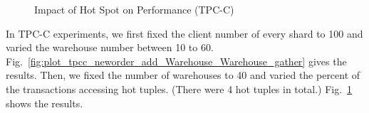 \documentclass[conference]{IEEEtran}
\begin{document}
\begin{figure}[tbp]
  \centering
      \caption{Impact of Hot Spot on Performance (TPC-C) }
      \label{fig:plot_tpcc_neworder_add_HotItem_HotItem_gather}
\end{figure}



In TPC-C experiments, we first fixed the client number of every shard to 100 and varied the warehouse number between 10 to 60.
Fig.~\ref{fig:plot_tpcc_neworder_add_Warehouse_Warehouse_gather} gives the results.
Then, we fixed the number of warehouses to 40 and varied the percent of the transactions accessing hot tuples. (There were 4 hot tuples in total.)
Fig.~\ref{fig:plot_tpcc_neworder_add_HotItem_HotItem_gather} shows the results.
\end{document}
